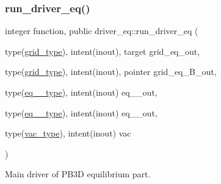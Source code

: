 \subsubsection{\texorpdfstring{run\+\_\+driver\+\_\+eq()}{run\_driver\_eq()}}
{\footnotesize\ttfamily integer function, public driver\+\_\+eq\+::run\+\_\+driver\+\_\+eq (\begin{DoxyParamCaption}\item[{type(\hyperlink{structgrid__vars_1_1grid__type}{grid\+\_\+type}), intent(inout), target}]{grid\+\_\+eq\+\_\+out,  }\item[{type(\hyperlink{structgrid__vars_1_1grid__type}{grid\+\_\+type}), intent(inout), pointer}]{grid\+\_\+eq\+\_\+\+B\+\_\+out,  }\item[{type(\hyperlink{structeq__vars_1_1eq__1__type}{eq\+\_\+1\+\_\+type}), intent(inout)}]{eq\+\_\+\_\+out,  }\item[{type(\hyperlink{structeq__vars_1_1eq__2__type}{eq\+\_\+2\+\_\+type}), intent(inout)}]{eq\+\_\+\_\+out,  }\item[{type(\hyperlink{structvac__vars_1_1vac__type}{vac\+\_\+type}), intent(inout)}]{vac }\end{DoxyParamCaption})}



Main driver of P\+B3D equilibrium part. 


